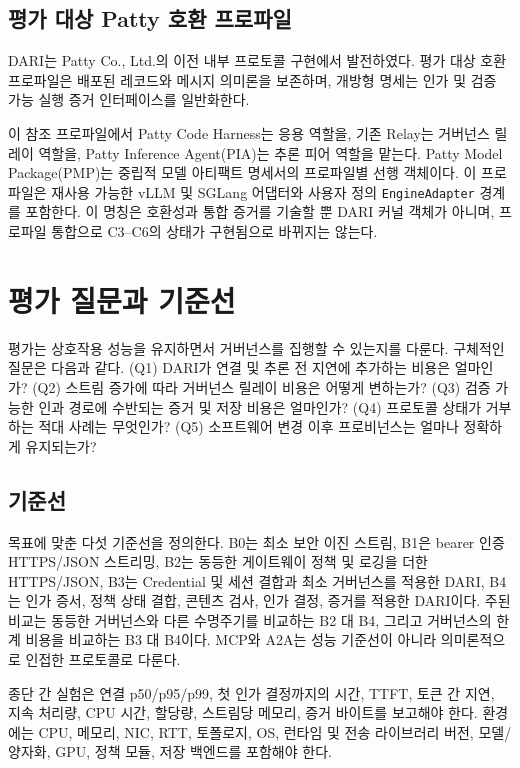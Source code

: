 \documentclass[10pt]{article}
\begin{document}
\subsection{평가 대상 Patty 호환 프로파일}

DARI는 Patty Co., Ltd.의 이전 내부 프로토콜 구현에서 발전하였다. 평가 대상 호환 프로파일은 배포된 레코드와 메시지 의미론을 보존하며, 개방형 명세는 인가 및 검증 가능 실행 증거 인터페이스를 일반화한다.

이 참조 프로파일에서 Patty Code Harness는 응용 역할을, 기존 Relay는 거버넌스 릴레이 역할을, Patty Inference Agent(PIA)는 추론 피어 역할을 맡는다. Patty Model Package(PMP)는 중립적 모델 아티팩트 명세서의 프로파일별 선행 객체이다. 이 프로파일은 재사용 가능한 vLLM 및 SGLang 어댑터와 사용자 정의 \texttt{EngineAdapter} 경계를 포함한다. 이 명칭은 호환성과 통합 증거를 기술할 뿐 DARI 커널 객체가 아니며, 프로파일 통합으로 C3--C6의 상태가 구현됨으로 바뀌지는 않는다.

\section{평가 질문과 기준선}

평가는 상호작용 성능을 유지하면서 거버넌스를 집행할 수 있는지를 다룬다. 구체적인 질문은 다음과 같다. (Q1) DARI가 연결 및 추론 전 지연에 추가하는 비용은 얼마인가? (Q2) 스트림 증가에 따라 거버넌스 릴레이 비용은 어떻게 변하는가? (Q3) 검증 가능한 인과 경로에 수반되는 증거 및 저장 비용은 얼마인가? (Q4) 프로토콜 상태가 거부하는 적대 사례는 무엇인가? (Q5) 소프트웨어 변경 이후 프로비넌스는 얼마나 정확하게 유지되는가?

\subsection{기준선}

목표에 맞춘 다섯 기준선을 정의한다. B0는 최소 보안 이진 스트림, B1은 bearer 인증 HTTPS/JSON 스트리밍, B2는 동등한 게이트웨이 정책 및 로깅을 더한 HTTPS/JSON, B3는 Credential 및 세션 결합과 최소 거버넌스를 적용한 DARI, B4는 인가 증서, 정책 상태 결합, 콘텐츠 검사, 인가 결정, 증거를 적용한 DARI이다. 주된 비교는 동등한 거버넌스와 다른 수명주기를 비교하는 B2 대 B4, 그리고 거버넌스의 한계 비용을 비교하는 B3 대 B4이다. MCP와 A2A는 성능 기준선이 아니라 의미론적으로 인접한 프로토콜로 다룬다.

종단 간 실험은 연결 p50/p95/p99, 첫 인가 결정까지의 시간, TTFT, 토큰 간 지연, 지속 처리량, CPU 시간, 할당량, 스트림당 메모리, 증거 바이트를 보고해야 한다. 환경에는 CPU, 메모리, NIC, RTT, 토폴로지, OS, 런타임 및 전송 라이브러리 버전, 모델/양자화, GPU, 정책 모듈, 저장 백엔드를 포함해야 한다.
\end{document}
